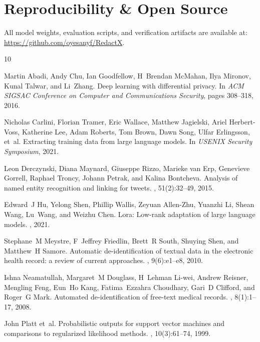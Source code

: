 \documentclass[11pt,a4paper]{article}
\begin{document}
\section*{Reproducibility & Open Source}
All model weights, evaluation scripts, and verification artifacts are available at: \\
\url{https://github.com/oyesanyf/RedactX}.


\begin{thebibliography}{10}

Martin Abadi, Andy Chu, Ian Goodfellow, H~Brendan McMahan, Ilya Mironov, Kunal Talwar, and Li~Zhang.
\newblock Deep learning with differential privacy.
\newblock In {\em ACM SIGSAC Conference on Computer and Communications Security}, pages 308--318, 2016.

Nicholas Carlini, Florian Tramer, Eric Wallace, Matthew Jagielski, Ariel Herbert-Voss, Katherine Lee, Adam Roberts, Tom Brown, Dawn Song, Ulfar Erlingsson, et~al.
\newblock Extracting training data from large language models.
\newblock In {\em USENIX Security Symposium}, 2021.

Leon Derczynski, Diana Maynard, Giuseppe Rizzo, Marieke van Erp, Genevieve Gorrell, Raphael Troncy, Johann Petrak, and Kalina Bontcheva.
\newblock Analysis of named entity recognition and linking for tweets.
, 51(2):32--49, 2015.

Edward~J Hu, Yelong Shen, Phillip Wallis, Zeyuan Allen-Zhu, Yuanzhi Li, Shean Wang, Lu~Wang, and Weizhu Chen.
\newblock Lora: Low-rank adaptation of large language models.
, 2021.

Stephane~M Meystre, F~Jeffrey Friedlin, Brett~R South, Shuying Shen, and Matthew~H Samore.
\newblock Automatic de-identification of textual data in the electronic health record: a review of current approaches.
, 9(6):e1--e8, 2010.

Ishna Neamatullah, Margaret~M Douglass, H~Lehman Li-wei, Andrew Reisner, Mengling Feng, Eun~Ho Kang, Fatima~Ezzahra Choudhary, Gari~D Clifford, and Roger~G Mark.
\newblock Automated de-identification of free-text medical records.
, 8(1):1--17, 2008.

John Platt et~al.
\newblock Probabilistic outputs for support vector machines and comparisons to regularized likelihood methods.
, 10(3):61--74, 1999.


\end{thebibliography}
\end{document}

